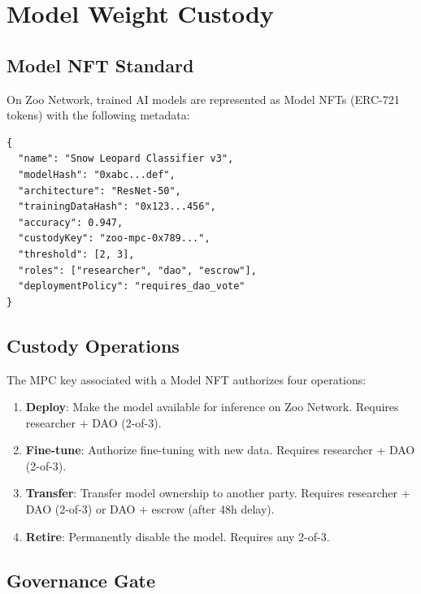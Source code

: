 \section{Model Weight Custody}

\label{sec:model-custody}

\subsection{Model NFT Standard}

On Zoo Network, trained AI models are represented as Model NFTs (ERC-721 tokens) with the following metadata:

\begin{lstlisting}[basicstyle=\ttfamily\small,caption=Model NFT Metadata]
{
  "name": "Snow Leopard Classifier v3",
  "modelHash": "0xabc...def",
  "architecture": "ResNet-50",
  "trainingDataHash": "0x123...456",
  "accuracy": 0.947,
  "custodyKey": "zoo-mpc-0x789...",
  "threshold": [2, 3],
  "roles": ["researcher", "dao", "escrow"],
  "deploymentPolicy": "requires_dao_vote"
}
\end{lstlisting}

\subsection{Custody Operations}

The MPC key associated with a Model NFT authorizes four operations:

\begin{enumerate}
    \item \textbf{Deploy}: Make the model available for inference on Zoo Network. Requires researcher + DAO (2-of-3).

    \item \textbf{Fine-tune}: Authorize fine-tuning with new data. Requires researcher + DAO (2-of-3).

    \item \textbf{Transfer}: Transfer model ownership to another party. Requires researcher + DAO (2-of-3) or DAO + escrow (after 48h delay).

    \item \textbf{Retire}: Permanently disable the model. Requires any 2-of-3.
\end{enumerate}

\subsection{Governance Gate}

